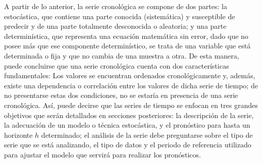 \documentclass[
]{article}
\begin{document}
A partir de lo anterior, la serie cronológica se compone de dos partes:
la estocástica, que contiene una parte conocida (sistemática) y
susceptible de predecir y de una parte totalmente desconocida o
aleatoria; y una parte determinística, que representa una ecuación
matemática sin error, dado que no posee más que ese componente
determinístico, se trata de una variable que está determinada o fija y
que no cambia de una muestra a otra. De esta manera, puede concluirse
que una serie cronológica cuenta con dos características fundamentales:
Los valores se encuentran ordenados cronológicamente y, además, existe
una dependencia o correlación entre los valores de dicha serie de
tiempo; de no presentarse estas dos condiciones, no se estaría en
presencia de una serie cronológica. Así, puede decirse que las series de
tiempo se enfocan en tres grandes objetivos que serán detallados en
secciones posteriores: la descripción de la serie, la adecuación de un
modelo o técnica estocástica, y el pronóstico para hasta un horizonte
\(h\) determinado; el análisis de la serie debe preguntarse sobre el
tipo de serie que se está analizando, el tipo de datos y el periodo de
referencia utilizado para ajustar el modelo que servirá para realizar
los pronósticos.
\end{document}

